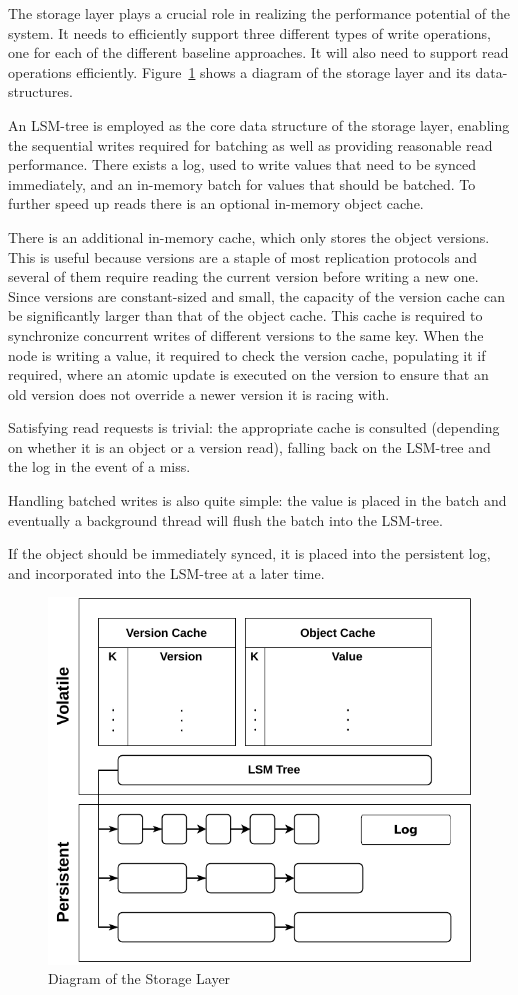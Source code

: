 The storage layer plays a crucial role in realizing the
performance potential of the system. It needs to efficiently support
three different types of write operations, one for each of the
different baseline approaches. It will also need to support read operations
efficiently. Figure~\ref{fig:storage_layer} shows a diagram of
the storage layer and its data-structures.

An \ac{LSM-tree} is employed as the core data structure of the storage
layer, enabling the sequential writes required for batching as
well as providing reasonable read performance. There exists a
log, used to write values that need to be synced immediately, and
an in-memory batch for values that should be batched. To further speed
up reads there is an optional in-memory object cache.

There is an additional in-memory cache, which only stores the
object versions. This is useful because versions are a staple of
most replication protocols and several of them require reading
the current version before writing a new one. Since versions are
constant-sized and small, the capacity of the version cache can
be significantly larger than that of the object cache. This cache
is required to synchronize concurrent writes of different
versions to the same key. When the node is writing a value, it required to
check the version cache, populating it if required, where an
atomic update is executed on the version to ensure that an old
version does not override a newer version it is racing with.

Satisfying read requests is trivial: the appropriate cache is
consulted (depending on whether it is an object or a version
read), falling back on the \ac{LSM-tree} and the log in the event of a miss.

Handling batched writes is also quite simple: the
value is placed in the batch and eventually a background thread
will flush the batch into the \ac{LSM-tree}.

If the object should be immediately synced, it is placed into the
persistent log, and incorporated into the \ac{LSM-tree} at a later
time.

\begin{figure}[t]
    \centering
    \includegraphics[width=.75\linewidth]{img/storage_layer}
    \caption{Diagram of the Storage Layer}\label{fig:storage_layer}
\end{figure}

